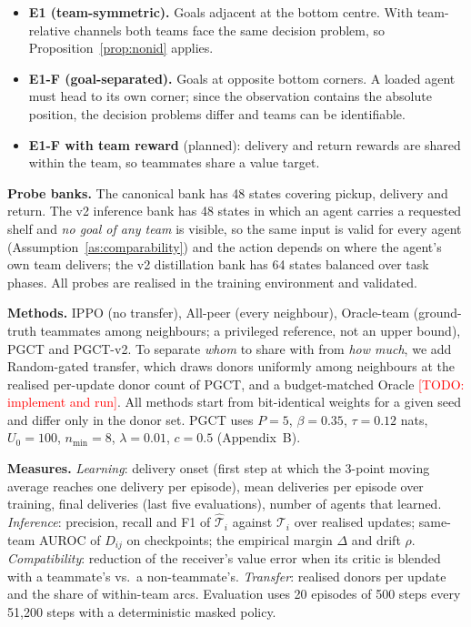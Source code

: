 \documentclass{article}
\theoremstyle{remark}
\newcommand{\todo}[1]{\textcolor{red}{[TODO: #1]}}
\newcommand{\ours}{PGCT}
\begin{document}
\begin{itemize}
  \item \textbf{E1 (team-symmetric).} Goals adjacent at the bottom centre. With team-relative channels both teams face the
    same decision problem, so Proposition~\ref{prop:nonid} applies.
  \item \textbf{E1-F (goal-separated).} Goals at opposite bottom corners. A loaded agent must head to its own corner; since the
    observation contains the absolute position, the decision problems differ and teams can be identifiable.
  \item \textbf{E1-F with team reward} (planned): delivery and return rewards are shared within the team, so teammates share a
    value target.
\end{itemize}

\textbf{Probe banks.} The canonical bank has 48 states covering pickup, delivery and return. The v2 inference bank has 48 states
in which an agent carries a requested shelf and \emph{no goal of any team} is visible, so the same input is valid for every agent
(Assumption~\ref{as:comparability}) and the action depends on where the agent's own team delivers; the v2 distillation bank has 64
states balanced over task phases. All probes are realised in the training environment and validated.

\textbf{Methods.} IPPO (no transfer), All-peer (every neighbour), Oracle-team (ground-truth teammates among neighbours; a privileged
reference, not an upper bound), \ours{} and \ours{}-v2. To separate \emph{whom} to share with from \emph{how much}, we add
Random-gated transfer, which draws donors uniformly among neighbours at the realised per-update donor count of \ours{}, and a
budget-matched Oracle \todo{implement and run}. All methods start from bit-identical weights for a given seed and differ only in
the donor set. \ours{} uses $P=5$, $\beta=0.35$, $\tau=0.12$ nats, $U_0=100$, $n_{\min}=8$, $\lambda=0.01$, $c=0.5$
(Appendix~B).

\textbf{Measures.} \emph{Learning}: delivery onset (first step at which the 3-point moving average reaches one delivery per
episode), mean deliveries per episode over training, final deliveries (last five evaluations), number of agents that learned.
\emph{Inference}: precision, recall and F1 of $\hat{\mathcal{T}}_i$ against $\mathcal{T}_i$ over realised updates; same-team AUROC
of $D_{ij}$ on checkpoints; the empirical margin $\Delta$ and drift $\rho$. \emph{Compatibility}: reduction of the receiver's value
error when its critic is blended with a teammate's vs.\ a non-teammate's. \emph{Transfer}: realised donors per update and the
share of within-team arcs. Evaluation uses 20 episodes of 500 steps every 51{,}200 steps with a deterministic masked policy.
\end{document}
